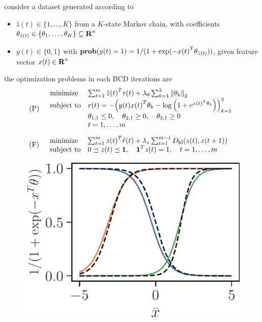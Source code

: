 \documentclass[a0]{a0poster}
\begin{document}
\begin{textblock}{7}
consider a dataset generated according to
\begin{itemize}
    \item $\hat{z}(t) \in \{1, \ldots, K\}$ from a $K$-state Markov chain, with coefficients $\theta_{\hat{z}(t)} \in \{\theta_1, \ldots, \theta_K\} \subseteq {\bf R{}}^n$
    \item $y(t) \in \{0, 1\}$ with $\mathop{\bf prob{}}(y(t) = 1) = 1/(1 + \exp(-{x(t)}^T \theta_{\hat{z}(t)}))$, given feature vector $x(t) \in {\bf R{}}^n$
\end{itemize}
\begin{minipage}{0.7\textwidth}
the optimization problems in each BCD iterations are
\[
    \begin{aligned}
        &\mbox{(P)}\quad
        \begin{array}{ll}
            \mbox{minimize} & \sum_{t = 1}^{m} {\tilde{z}(t)}^T r(t) + \lambda_\theta \sum_{k = 1}^{3} {\lVert \theta_k \rVert}_2\\
            \mbox{subject to} & r(t) = -{\left(y(t){x(t)}^T \theta_k - \log\left(1 + e^{{x(t)}^T \theta_k}\right)\right)}_{k = 1}^{3}\\
            & \theta_{1, 1} \leq 0,\quad \theta_{2, 1} \geq 0,\quad \theta_{3, 1} \geq 0\\
            & t = 1, \ldots, m
        \end{array}\\[5pt]
        &\mbox{(F)}\quad
        \begin{array}{ll}
            \mbox{minimize} & \sum_{t = 1}^{m} {z(t)}^T \tilde{r}(t) + \lambda_z \sum_{t = 1}^{m - 1} \mathop{D_{\rm kl}}(z(t), z(t + 1))\\
            \mbox{subject to} & 0 \preceq z(t) \preceq {\bf 1{}},\quad {\bf 1{}}^T z(t) = 1,\quad t = 1, \ldots, m
        \end{array}
    \end{aligned}
\]
\end{minipage}%
\begin{minipage}{0.3\textwidth}
    \begin{figure}
        \centering
        \includegraphics[width=\textwidth]{media/io_hmm_crop.eps}

\end{figure}
\end{minipage}
\end{textblock}
\end{document}
